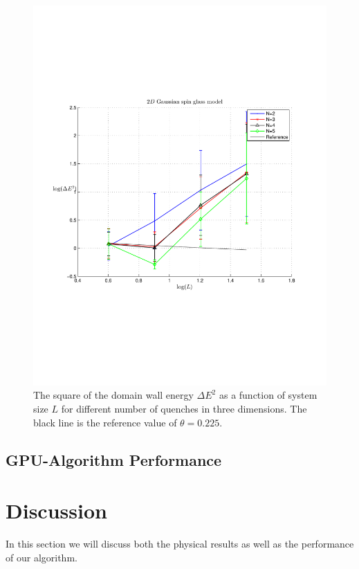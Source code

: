 \documentclass[paper=a4, fontsize=11pt]{scrartcl} %
\numberwithin{equation}{section} %
\numberwithin{figure}{section} %
\numberwithin{table}{section} %
\begin{document}
\begin{figure}[hbtp]
\centering
\includegraphics[width=\textwidth]{images/spinglass3D.pdf}
\caption{The square of the domain wall energy $\Delta E ^ 2$ as a function of system size $L$ for different number of quenches in three dimensions. The black line is the reference value of $\theta=0.225$.}
\label{fig:E_3D}
\end{figure}

\subsection{GPU-Algorithm Performance}

\section{Discussion}
\label{sec:discussion}
In this section we will discuss both the physical results as well as the performance of our algorithm.
\end{document}
